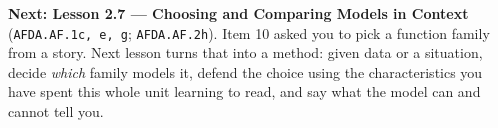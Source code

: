 \documentclass[10pt]{article}
\begin{document}
\vspace{0.10in}

\begin{remindbox}
\small
\textbf{Next: Lesson 2.7 --- Choosing and Comparing Models in Context} (\texttt{AFDA.AF.1c, e, g};
\texttt{AFDA.AF.2h}). Item 10 asked you to pick a function family from a story. Next lesson turns that
into a method: given data or a situation, decide \emph{which} family models it, defend the choice
using the characteristics you have spent this whole unit learning to read, and say what the model can
and cannot tell you.
\end{remindbox}
\end{document}
